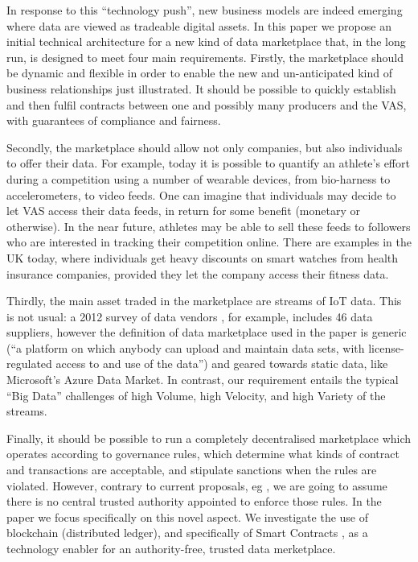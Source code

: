 \documentclass[chi_draft]{sigchi}
\begin{document}
In response to this ``technology push'', new business models are indeed emerging \cite{Stahl2016,7765669} where data are viewed as tradeable digital assets. 
In this paper we propose an initial technical architecture for a new kind of data marketplace that, in the long run, is designed to meet four main requirements.
Firstly, the marketplace should be dynamic and flexible in order to enable the new and un-anticipated kind of business relationships just illustrated. It should be possible to quickly  establish and then fulfil contracts between one and possibly many producers and the VAS, with guarantees of compliance and fairness.

Secondly, the marketplace should allow not only companies, but also individuals to offer their data. 
%
For example, today it is possible to quantify an athlete's effort during a competition using a number of wearable devices, from bio-harness to accelerometers, to video feeds.
One can imagine that individuals may decide to let VAS access their data feeds, in return for some benefit (monetary or otherwise).
In the near future, athletes may be able to sell these feeds to followers who are interested in tracking their competition online.
There are examples in the UK today, where individuals get heavy discounts on smart watches from health insurance companies, provided they let the company access their fitness data.

Thirdly, the main asset traded in the marketplace are streams of IoT data. This is not usual: a 2012 survey of data vendors \cite{Schomm2013}, for example, includes 46 data suppliers, however the definition of data marketplace used in the paper is generic (``a platform on which anybody can upload and maintain data sets, with license-regulated access to and use of the data'') and geared towards static data, like Microsoft's Azure Data Market.
In contrast, our requirement entails the typical ``Big Data'' challenges of high Volume, high Velocity, and high Variety of the streams.

Finally, it should be possible to run a completely decentralised marketplace which operates according to governance rules, which determine what kinds of contract and transactions are acceptable, and stipulate sanctions when the rules are violated. 
However, contrary to current proposals, eg \cite{Cao:2016:MMR:2926746.2883611}, we are going to assume  there is no central trusted authority appointed to enforce those rules.
In the paper we focus specifically on this novel aspect. We investigate the use of blockchain (distributed ledger), and specifically of Smart Contracts \cite{Buterin2014}, as a technology enabler for an authority-free, trusted data merketplace.
\end{document}
